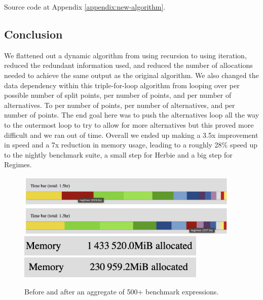 \documentclass{article}
\begin{document}
Source code at Appendix \ref{appendix:new-algorithm}.

\subsection{Conclusion}

We flattened out a dynamic algorithm from using recursion to using iteration, reduced the redundant information used, and reduced the number of allocations needed to achieve the same output as the original algorithm. We also changed the data dependency within this triple-for-loop algorithm from looping over per possible number of split points, per number of points, and per number of alternatives. To per number of points, per number of alternatives, and per number of points. The end goal here was to push the alternatives loop all the way to the outermost loop to try to allow for more alternatives but this proved more difficult and we ran out of time. 
Overall we ended up making a 3.5x improvement in speed and a 7x reduction in memory usage, leading to a roughly 28\% speed up to the nightly benchmark suite, a small step for Herbie and a big step for Regimes.
 
\begin{figure}[htbp]
\begin{center}
\includegraphics[width=0.95\textwidth]{regimes-before.png}
\includegraphics[width=0.95\textwidth]{regimes-after.png}
\includegraphics[width=0.80\textwidth]{memory-before.png}
\includegraphics[width=0.80\textwidth]{memory-after.png}
\caption{Before and after an aggregate of 500+ benchmark expressions.}
\label{fig:before-after} 
\end{center}
\end{figure}
\end{document}
